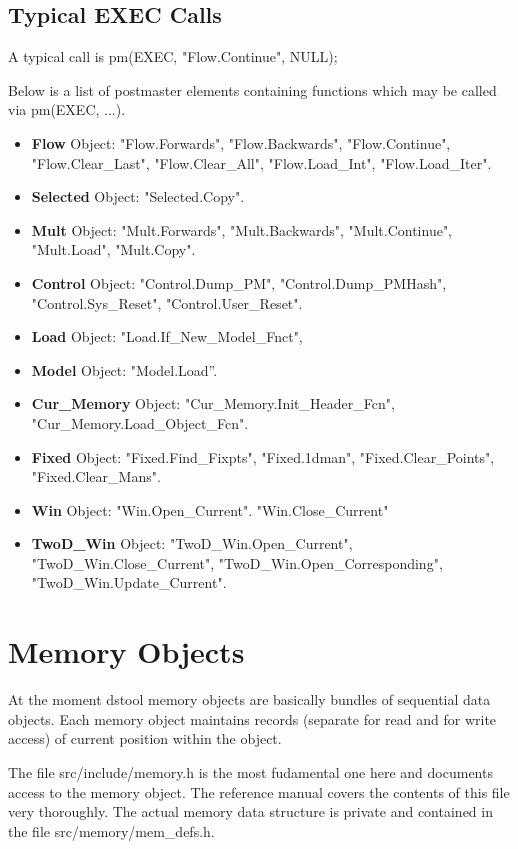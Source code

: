 \subsection{Typical EXEC Calls}

A typical call is pm(EXEC, "Flow.Continue", NULL);

Below is a list of postmaster elements containing functions which may be 
called via pm(EXEC, ...).

\begin{itemize}
\item {\bf Flow} Object: "Flow.Forwards", "Flow.Backwards", "Flow.Continue",  "Flow.Clear\_Last", "Flow.Clear\_All",   "Flow.Load\_Int",  "Flow.Load\_Iter".
\item {\bf Selected} Object: "Selected.Copy".
\item {\bf Mult} Object:     "Mult.Forwards", "Mult.Backwards", "Mult.Continue",  "Mult.Load", "Mult.Copy".
\item {\bf Control} Object:   "Control.Dump\_PM", "Control.Dump\_PMHash",
  "Control.Sys\_Reset", "Control.User\_Reset".
\item {\bf Load} Object:   "Load.If\_New\_Model\_Fnct",
\item {\bf Model} Object:   "Model.Load''.
\item {\bf Cur\_Memory} Object:       "Cur\_Memory.Init\_Header\_Fcn",     "Cur\_Memory.Load\_Object\_Fcn".
\item {\bf Fixed} Object:   "Fixed.Find\_Fixpts", "Fixed.1dman",
  "Fixed.Clear\_Points", "Fixed.Clear\_Mans".
\item {\bf Win} Object:       "Win.Open\_Current".
    "Win.Close\_Current"
\item {\bf TwoD\_Win} Object:     "TwoD\_Win.Open\_Current", "TwoD\_Win.Close\_Current", "TwoD\_Win.Open\_Corresponding",     "TwoD\_Win.Update\_Current".
\end{itemize}

\section{Memory Objects}

At the moment dstool memory objects are basically bundles of
sequential data objects. Each memory object  maintains
records (separate for read and for write access) of current position 
within the object.

The file src/include/memory.h is the most fudamental one here and documents
access to the memory object. The reference manual covers the contents of
this file very thoroughly. The actual memory data structure is private
and contained in the file src/memory/mem\_defs.h. 

